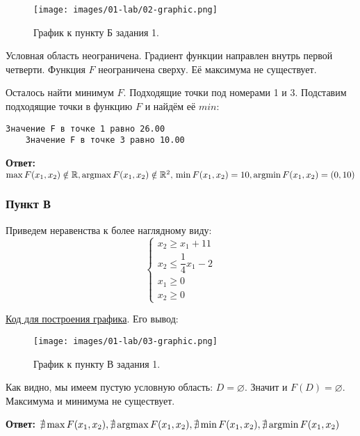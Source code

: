 \begin{figure}[H]
    \texttt{[image: images/01-lab/02-graphic.png]}
    \caption{График к пункту Б задания 1.}
    \label{01-lab-02-graphic}
\end{figure}

Условная область неограничена. Градиент функции направлен внутрь первой четверти. Функция $F$ неограничена сверху. Её максимума не существует.

Осталось найти минимум $F$. Подходящие точки под номерами 1 и 3. Подставим подходящие точки в функцию $F$ и найдём её $min$:

\begin{lstlisting}[language=text]
    Значение F в точке 1 равно 26.00
    Значение F в точке 3 равно 10.00
\end{lstlisting}

\textbf{Ответ:} $\max F(x_1, x_2) \notin \mathbb R, \operatorname*{argmax} F(x_1, x_2) \notin \mathbb R^2,\\
    \min F(x_1, x_2) = 10, \operatorname*{argmin} F(x_1, x_2) = (0, 10)$ \label{01-lab-b-answer}

\subsubsection{Пункт В}\label{01-lab-c}

Приведем неравенства к более наглядному виду:
\[
    \begin{cases}
        x_2 \geq x_1 + 11            \\
        x_2 \leq \dfrac{1}{4}x_1 - 2 \\
        x_1 \geq 0                   \\
        x_2 \geq 0
    \end{cases}
\]

\href{https://github.com/retrobannerS/optimization_methods/blob/main/python/01-lab/C.%2001.py}{Код для построения графика}. Его вывод:

\begin{figure}[H]
    \texttt{[image: images/01-lab/03-graphic.png]}
    \caption{График к пункту В задания 1.}
    \label{01-lab-03-graphic}
\end{figure}

Как видно, мы имеем пустую условную область: $D = \varnothing$. Значит и $F(D) = \varnothing$. Максимума и минимума не существует.

\textbf{Ответ:} $\nexists\max F(x_1, x_2), \nexists\operatorname*{argmax} F(x_1, x_2), \nexists\min F(x_1, x_2), \nexists\operatorname*{argmin} F(x_1, x_2)$ \label{01-lab-c-answer}

\newpage

